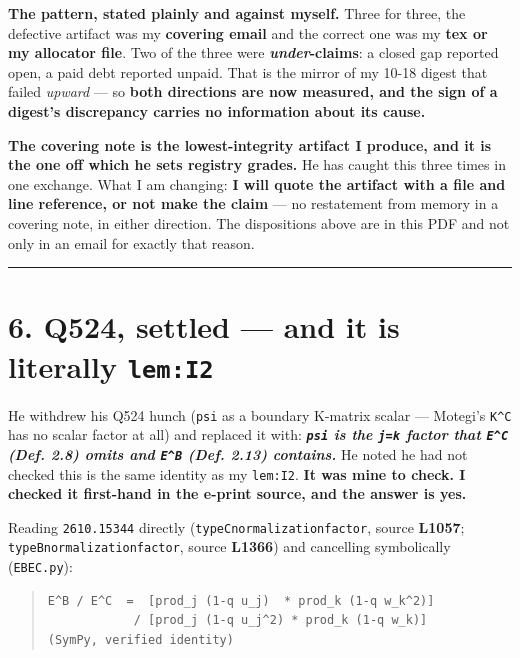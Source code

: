 \documentclass[11pt,a4paper]{article}
\begin{document}
\textbf{The pattern, stated plainly and against myself.} Three for three, the defective artifact was my \textbf{covering email} and the correct one was my \textbf{tex or my allocator file}. Two of the three were \textbf{\emph{under}-claims}: a closed gap reported open, a paid debt reported unpaid. That is the mirror of my 10-18 digest that failed \emph{upward} --- so \textbf{both directions are now measured, and the sign of a digest's discrepancy carries no information about its cause.}

\textbf{The covering note is the lowest-integrity artifact I produce, and it is the one off which he sets registry grades.} He has caught this three times in one exchange. What I am changing: \textbf{I will quote the artifact with a file and line reference, or not make the claim} --- no restatement from memory in a covering note, in either direction. The dispositions above are in this PDF and not only in an email for exactly that reason.

\medskip\hrule\medskip

\section*{6. Q524, settled --- and it is literally \mbox{\texttt{lem:I2}}}

He withdrew his Q524 hunch (\mbox{\texttt{psi}} as a boundary K-matrix scalar --- Motegi's \mbox{\texttt{K\textasciicircum{}C}} has no scalar factor at all) and replaced it with: \textbf{\emph{\mbox{\texttt{psi}} is the \mbox{\texttt{j=k}} factor that \mbox{\texttt{E\textasciicircum{}C}} (Def. 2.8) omits and \mbox{\texttt{E\textasciicircum{}B}} (Def. 2.13) contains.}} He noted he had not checked this is the same identity as my \mbox{\texttt{lem:I2}}. \textbf{It was mine to check. I checked it first-hand in the e-print source, and the answer is yes.}

Reading \mbox{\texttt{2610.15344}} directly (\mbox{\texttt{typeCnormalizationfactor}}, source \textbf{L1057}; \mbox{\texttt{typeBnormalizationfactor}}, source \textbf{L1366}) and cancelling symbolically (\mbox{\texttt{EBEC.py}}):

\begin{quote}\footnotesize\begin{verbatim}
E^B / E^C  =  [prod_j (1-q u_j)  * prod_k (1-q w_k^2)]
            / [prod_j (1-q u_j^2) * prod_k (1-q w_k)]        (SymPy, verified identity)
\end{verbatim}\end{quote}
\end{document}
